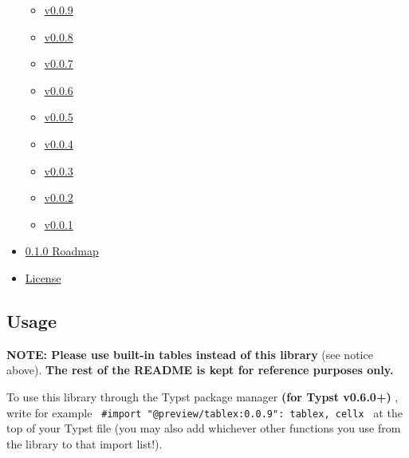 \begin{itemize}
  \begin{itemize}
  \tightlist
  \item
    \href{https://github.com/typst/packages/raw/main/packages/preview/tablex/0.0.9/\#v009}{v0.0.9}
  \item
    \href{https://github.com/typst/packages/raw/main/packages/preview/tablex/0.0.9/\#v008}{v0.0.8}
  \item
    \href{https://github.com/typst/packages/raw/main/packages/preview/tablex/0.0.9/\#v007}{v0.0.7}
  \item
    \href{https://github.com/typst/packages/raw/main/packages/preview/tablex/0.0.9/\#v006}{v0.0.6}
  \item
    \href{https://github.com/typst/packages/raw/main/packages/preview/tablex/0.0.9/\#v005}{v0.0.5}
  \item
    \href{https://github.com/typst/packages/raw/main/packages/preview/tablex/0.0.9/\#v004}{v0.0.4}
  \item
    \href{https://github.com/typst/packages/raw/main/packages/preview/tablex/0.0.9/\#v003}{v0.0.3}
  \item
    \href{https://github.com/typst/packages/raw/main/packages/preview/tablex/0.0.9/\#v002}{v0.0.2}
  \item
    \href{https://github.com/typst/packages/raw/main/packages/preview/tablex/0.0.9/\#v001}{v0.0.1}
  \end{itemize}
\item
  \href{https://github.com/typst/packages/raw/main/packages/preview/tablex/0.0.9/\#010-roadmap}{0.1.0
  Roadmap}
\item
  \href{https://github.com/typst/packages/raw/main/packages/preview/tablex/0.0.9/\#license}{License}
\end{itemize}

\subsection{Usage}\label{usage}

\textbf{NOTE: Please use built-in tables instead of this library} (see
notice above). \textbf{The rest of the README is kept for reference
purposes only.}

To use this library through the Typst package manager \textbf{(for Typst
v0.6.0+)} , write for example
\texttt{\ \#import\ "@preview/tablex:0.0.9":\ tablex,\ cellx\ } at the
top of your Typst file (you may also add whichever other functions you
use from the library to that import list!).

